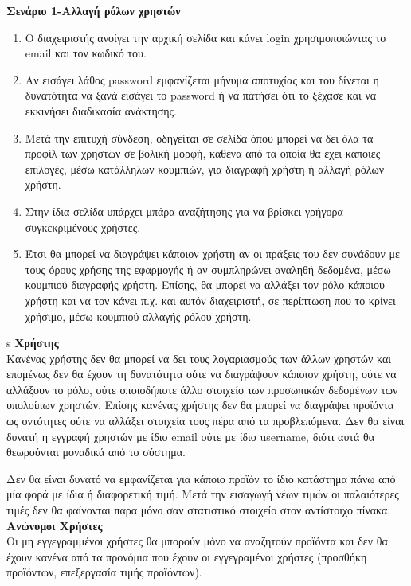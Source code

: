 \documentclass[12pt, oneside, a4paper]{report}
\begin{document}
\vspace{0.5cm}
\textbf{Σενάριο 1-Αλλαγή ρόλων χρηστών}
\begin{enumerate}
 \item  Ο διαχειριστής ανοίγει την αρχική σελίδα και κάνει login χρησιμοποιώντας το email και τον κωδικό του.
 \item Αν εισάγει λάθος password εμφανίζεται μήνυμα αποτυχίας και του δίνεται η δυνατότητα να ξανά εισάγει το password ή να πατήσει ότι το ξέχασε και να εκκινήσει διαδικασία ανάκτησης.
 \item Μετά την επιτυχή σύνδεση, οδηγείται σε σελίδα όπου μπορεί να δει όλα τα προφίλ των χρηστών σε βολική μορφή, καθένα από τα οποία θα έχει κάποιες επιλογές, μέσω κατάλληλων κουμπιών, για διαγραφή χρήστη ή αλλαγή ρόλων χρήστη. 
 \item Στην ίδια σελίδα υπάρχει μπάρα αναζήτησης για να βρίσκει γρήγορα συγκεκριμένους χρήστες.
 \item Έτσι θα μπορεί να διαγράψει κάποιον χρήστη αν οι πράξεις του δεν συνάδουν με τους όρους χρήσης της εφαρμογής ή αν συμπληρώνει αναληθή δεδομένα, μέσω κουμπιού διαγραφής χρήστη. Επίσης, θα μπορεί να αλλάξει τον ρόλο κάποιου χρήστη και να τον κάνει π.χ. και αυτόν διαχειριστή, σε περίπτωση που το κρίνει χρήσιμο, μέσω κουμπιού αλλαγής ρόλου χρήστη.
\end{enumerate}


s
\textbf{Χρήστης}\\
\vspace{0.5cm}
\hspace{0.6cm}Κανένας χρήστης δεν θα μπορεί να δει τους λογαριασμούς των άλλων χρηστών και επομένως δεν θα έχουν τη δυνατότητα ούτε να διαγράψουν κάποιον χρήστη, ούτε να αλλάξουν το ρόλο, ούτε οποιοδήποτε άλλο στοιχείο των προσωπικών δεδομένων των υπολοίπων χρηστών. Επίσης κανένας χρήστης δεν θα μπορεί να διαγράψει προϊόντα ως οντότητες ούτε να αλλάξει στοιχεία τους πέρα από τα προβλεπόμενα. Δεν θα είναι δυνατή η εγγραφή χρηστών με ίδιο email ούτε με ίδιο username, διότι αυτά θα θεωρούνται μοναδικά από το σύστημα. 

\hspace{0.6cm}Δεν θα είναι δυνατό να εμφανίζεται για κάποιο προϊόν το ίδιο κατάστημα πάνω από μία φορά με ίδια ή διαφορετική τιμή. Μετά την εισαγωγή νέων τιμών οι παλαιότερες τιμές δεν θα φαίνονται παρα μόνο σαν στατιστικό στοιχείο στον αντίστοιχο πίνακα.\\

\vspace{0.5cm}
\textbf{Ανώνυμοι Χρήστες}\\
\vspace{0.5cm}
\hspace{0.6cm}Οι μη εγγεγραμμένοι χρήστες θα μπορούν μόνο να αναζητούν προϊόντα και δεν θα έχουν κανένα από τα προνόμια που έχουν οι εγγεγραμένοι χρήστες (προσθήκη προϊόντων, επεξεργασία τιμής προϊόντων).\\
\end{document}
